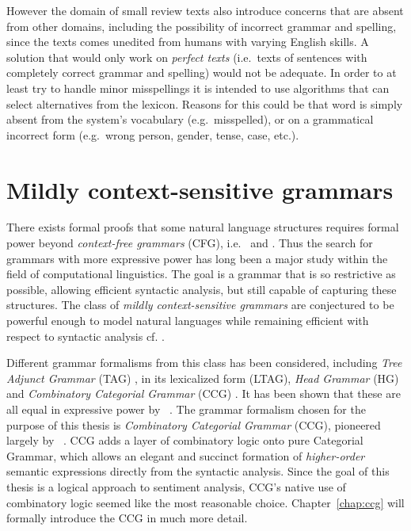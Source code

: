 However the domain of small review texts also introduce concerns that are absent from other domains, including the possibility of incorrect grammar and spelling, since the texts comes unedited from humans with varying English skills. A solution that would only work on \emph{perfect texts} (i.e.\ texts of sentences with completely correct grammar and spelling) would not be adequate. In order to at least try to handle minor misspellings it is intended to use algorithms that can select alternatives from the lexicon. Reasons for this could be that word is simply absent  from the system's vocabulary (e.g.\ misspelled), or on a grammatical incorrect form (e.g.\ wrong person, gender, tense, case, etc.). 

\section{Mildly context-sensitive grammars}
There exists formal proofs that some natural language structures requires formal power beyond \emph{context-free grammars} (CFG), i.e.\ \cite{nlpNotCFG} and \cite{nlpNotCFG2}. Thus the search for grammars with more expressive power has long been a major study within the field of computational linguistics. The goal is a grammar that is so restrictive as possible, allowing efficient syntactic analysis, but still capable of capturing these structures. The class of \emph{mildly context-sensitive grammars} are conjectured to be powerful enough to model natural languages while remaining efficient with respect to syntactic analysis cf. \cite{mildlyCSG}.

Different grammar formalisms from this class has been considered, including \emph{Tree Adjunct Grammar} (TAG) \cite{tag}, in its lexicalized form (LTAG), \emph{Head Grammar} (HG) \cite{hg} and \emph{Combinatory Categorial Grammar} (CCG) \cite{steedmanDraft}. It has been shown that these are all equal in expressive power by \citeauthor{theEquivalence}~. The grammar formalism chosen for the purpose of this thesis is \emph{Combinatory Categorial Grammar} (CCG), pioneered largely by \citeauthor{sp}~. CCG adds a layer of combinatory logic onto pure Categorial Grammar, which allows an elegant and succinct formation of \emph{higher-order} semantic expressions directly from the syntactic analysis. Since the goal of this thesis is a logical approach to sentiment analysis, CCG's native use of combinatory logic seemed like the most reasonable choice. Chapter~\ref{chap:ccg} will formally introduce the CCG in much more detail.

